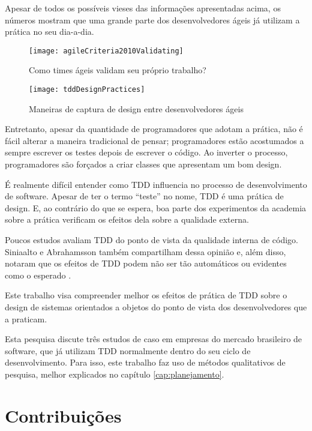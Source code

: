 Apesar de todos os possíveis vieses das informações apresentadas acima, os
números mostram que uma grande parte dos desenvolvedores ágeis já utilizam a 
prática no seu dia-a-dia.

\begin{figure}
	\centering
	\texttt{[image: agileCriteria2010Validating]}
	\caption{Como times ágeis validam seu próprio trabalho?}
	\label{fig:wambler-agile-2010}
\end{figure}
	
\begin{figure}
	\centering
	\texttt{[image: tddDesignPractices]}
	\caption{Maneiras de captura de design entre desenvolvedores ágeis}   
	\label{fig:wambler-tdd-2008}
\end{figure}			

Entretanto, apesar da quantidade de programadores que adotam a prática, não é
fácil alterar a maneira tradicional de pensar; programadores estão acostumados a
sempre escrever os testes depois de escrever o código. Ao inverter o processo,
programadores são forçados a criar classes que apresentam um bom design.

É realmente difícil entender como TDD influencia no processo de desenvolvimento
de software. Apesar de ter o termo ``teste'' no nome, TDD é uma prática
de design. E, ao contrário do que se espera, boa parte dos experimentos da
academia sobre a prática verificam os efeitos dela sobre a qualidade externa. 

Poucos estudos avaliam TDD do ponto de vista da qualidade interna de código.
Siniaalto e Abrahamsson também compartilham dessa opinião e, além disso, notaram
que os efeitos de TDD podem não ser tão automáticos ou evidentes como o 
esperado \cite{alarming-results}.

Este trabalho visa compreender melhor os efeitos de prática de TDD sobre o
design de sistemas orientados a objetos do ponto de vista dos desenvolvedores
que a praticam. 

Esta pesquisa discute três estudos de caso em empresas do mercado brasileiro de
software, que já utilizam TDD normalmente dentro do seu ciclo de
desenvolvimento. Para isso, este trabalho faz uso de métodos qualitativos de
pesquisa, melhor explicados no capítulo \ref{cap:planejamento}.

\section{Contribuições}

